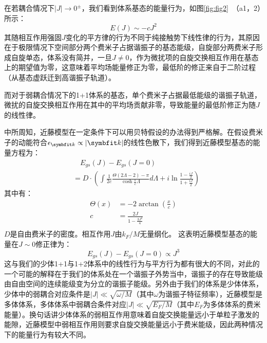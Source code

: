 在若耦合情况下$|J|\to0^{\pm}$，我们看到体系基态的能量行为，如图\ref{fig:fig2}~（a1，2）所示：
\begin{equation}
    E(J)\sim -cJ^2
\end{equation}
其随相互作用强固$J$变化的平方律的行为不同于纯接触势下线性律的行为，其原因在于极限情况下空间部分两个费米子占据谐振子的基态能级，自旋部分两费米子形成自旋单态，体系没有简并，一旦$J\neq0$，作为微扰项的自旋交换相互作用在基态上的期望值为零，这意味着平均场能量修正为零，最低阶的修正来自于二阶过程（从基态虚跃迁到高谐振子轨道）。

而对于弱耦合情况下的1+1体系的基态，单个费米子占据最低能级的谐振子轨道，微扰的自旋交换相互作用在其中的平均场贡献非零，导致能量的最低阶修正为随$J$的线性律。

中所周知，近藤模型在一定条件下可以用贝特假设的办法得到严格解\cite{Andrei-Furuya-Lowenstein}。在假设费米子的动能符合$\epsilon_{\Vector{k}}\propto|\Vector{k}|$的线性色散下，我们得到近藤模型基态的能量方程为：
\begin{equation}
    \begin{split}
        &\quad E_{gs}(J)-E_{gs}(J=0) \\
        &= D\cdot\left( \int\frac{1}{2c}\frac{\Theta(2\Lambda-2)-\pi}{\cosh\frac{\pi}{c}\Lambda}d\Lambda +i\ln\frac{1-\frac{iJ}{2}}{1+\frac{iJ}{2}} \right)
        \end{split}
\end{equation}
其中有：
\begin{equation}
    \begin{split}
    \Theta(x) &= -2\arctan(\frac{x}{c})\\
    c &= \frac{2J}{1-\frac{3J^2}{4}}\\
    \end{split}
\end{equation}
$D$是自由费米子的密度。相互作用$J$由$k_F/M$无量纲化。
这表明近藤模型基态的能量在$J\sim0$修正律为：
\begin{equation}
    E_{gs}(J)-E_{gs}(J=0) \propto J^3
\end{equation}
这与我们的少体1+1与1+2体系中的线性行为与平方行为都有很大的不同，对此的一个可能的解释在于我们的体系处在一个谐振子外势当中，谐振子的存在导致能级由自由空间的连续能级变为分立的谐振子能级。另外由于我们的体系是少体体系，少体中的弱耦合对应条件是$|J|\ll \sqrt{\omega/M}$（其中$\omega$为谐振子特征频率），近藤模型是多体体系，多体体系中弱耦合条件对应$|J|\ll \sqrt{E_F/M}$（其中$E_F$为多体体系的费米能量）。换句话讲少体体系的弱相互作用意味着自旋交换能量远小于单粒子激发的能隙，近藤模型中弱相互作用则要求自旋交换能量远小于费米能级，因此两种情况下的能量行为有较大不同。

